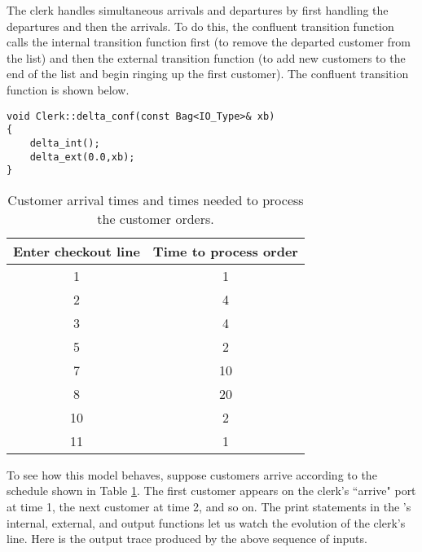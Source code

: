 The clerk handles simultaneous arrivals and departures by first handling the departures and then the arrivals. To do this, the confluent transition function calls the internal transition function first (to remove the departed customer from the list) and then the external transition function (to add new customers to the end of the list and begin ringing up the first customer). The confluent transition function is shown below.
\begin{verbatim}
void Clerk::delta_conf(const Bag<IO_Type>& xb)
{
    delta_int();
    delta_ext(0.0,xb);
}
\end{verbatim}

\begin{table}[h]
\centering
\begin{tabular}{|c|c|}
\hline
Enter checkout line & Time to process order \\ \hline
1 & 1 \\ \hline
2 & 4 \\ \hline
3 & 4 \\ \hline
5 & 2 \\ \hline
7 & 10 \\ \hline
8 & 20 \\ \hline
10 & 2 \\ \hline
11 & 1 \\ \hline
\end{tabular}
\caption{Customer arrival times and times needed to process the customer orders.}
\label{tab:customer_data}
\end{table}
To see how this model behaves, suppose customers arrive according to the schedule shown in Table \ref{tab:customer_data}. The first customer appears on the clerk's ``arrive" port at time 1, the next customer at time 2, and so on. The print statements in the 's internal, external, and output functions let us watch the evolution of the clerk's line. Here is the output trace produced by the above sequence of inputs.
